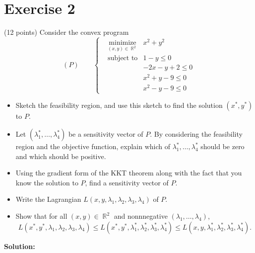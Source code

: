 \documentclass{article}
\DeclareMathOperator{\R}{\mathbb R}
\begin{document}
\newpage

\section*{Exercise 2}
(12 points) Consider the convex program 
 \begin{equation*}
(P)\qquad\left\{\begin{aligned}
& \underset{  (x,y) \in \R^2}{\text{minimize}}
&  x^2 + y^2 \\
& \text{subject to} & 1-y \leq 0 \\
 && -2x-y +2 \leq 0 \\
 && x^2 + y - 9 \leq 0 \\
 && x^2 - y - 9 \leq 0
\end{aligned}\right.
\end{equation*}
\begin{itemize}
\item Sketch the feasibility region, and use this sketch to find the solution $(x^*,y^*)$ to $P$.
\item Let $(\lambda_1^*,\dots,\lambda_4^*)$ be a sensitivity vector of $P$. By considering the feasibility region and the objective function, explain which of $\lambda_1^*, \dots, \lambda_4^*$ should be zero and which should be positive.
\item Using the gradient form of the KKT theorem along with the fact that you know the solution to $P$, find a sensitivity vector of $P$.
\item Write the Lagrangian $L(x,y,\lambda_1, \lambda_2,\lambda_3,\lambda_4)$ of $P$.
\item Show that for all $(x,y) \in \R^2$ and nonnnegative $(\lambda_1,\dots,\lambda_4)$,
\[L(x^*,y^*,\lambda_1,\lambda_2,\lambda_3,\lambda_4) \leq L(x^*,y^*,\lambda_1^*,\lambda_2^*,\lambda_3^*,\lambda_4^*) \leq L(x,y,\lambda_1^*,\lambda_2^*,\lambda_3^*,\lambda_4^*).\]
\end{itemize}

\textbf{Solution:} \\
\end{document}
